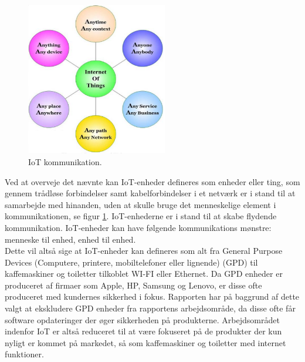         \begin{figure}[H]
            \centering
                \includegraphics[width=0.55\textwidth]{figures/IoT_definition.png}
            \caption{IoT kommunikation.\autocite{Sundmaeker2010}}\label{fig:IOTkom}
        \end{figure}
        Ved at overveje det nævnte kan IoT-enheder defineres som enheder eller ting, som gennem trådløse forbindelser samt kabelforbindelser i et netværk er i stand til at samarbejde med hinanden, uden at skulle bruge det menneskelige element i kommunikationen, se figur \ref{fig:IOTkom}. IoT-enhederne er i stand til at skabe flydende kommunikation.\autocite{Hashmi2017}
        IoT-enheder kan have følgende kommunikations mønstre: menneske til enhed, enhed til enhed.\\
        Dette vil altså sige at IoT-enheder kan defineres som alt fra General Purpose Devices (Computere, printere, mobiltelefoner eller lignende) (GPD) til kaffemaskiner og toiletter tilkoblet WI-FI eller Ethernet. Da GPD enheder er produceret af firmaer som Apple, HP, Samsung og Lenovo, er disse ofte produceret med kundernes sikkerhed i fokus. Rapporten har på baggrund af dette valgt at ekskludere GPD enheder fra rapportens arbejdsområde, da disse ofte får software opdateringer der øger sikkerheden på produkterne.
        Arbejdsområdet indenfor IoT er altså reduceret til at være fokuseret på de produkter der kun nyligt er kommet på markedet, så som kaffemaskiner og toiletter med internet funktioner. \\
